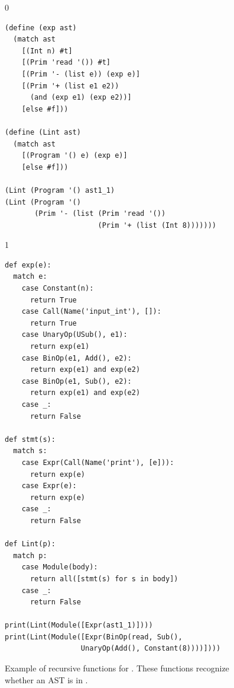 \documentclass[7x10,nocrop]{TimesAPriori_MIT}%
\def\racketEd{0}
\def\pythonEd{1}
\def\edition{1}
\begin{document}
\begin{figure}[tp]
{\if\edition\racketEd
\begin{lstlisting}
(define (exp ast)
  (match ast
    [(Int n) #t]
    [(Prim 'read '()) #t]
    [(Prim '- (list e)) (exp e)]
    [(Prim '+ (list e1 e2))
      (and (exp e1) (exp e2))]
    [else #f]))

(define (Lint ast)
  (match ast
    [(Program '() e) (exp e)]
    [else #f]))

(Lint (Program '() ast1_1)
(Lint (Program '()
       (Prim '- (list (Prim 'read '())
                      (Prim '+ (list (Int 8)))))))
\end{lstlisting}
\fi}
{\if\edition\pythonEd
\begin{lstlisting}
def exp(e):
  match e:
    case Constant(n):
      return True
    case Call(Name('input_int'), []):
      return True
    case UnaryOp(USub(), e1):
      return exp(e1)
    case BinOp(e1, Add(), e2):
      return exp(e1) and exp(e2)
    case BinOp(e1, Sub(), e2):
      return exp(e1) and exp(e2)
    case _:
      return False

def stmt(s):
  match s:
    case Expr(Call(Name('print'), [e])):
      return exp(e)
    case Expr(e):
      return exp(e)
    case _:
      return False
  
def Lint(p):
  match p:
    case Module(body):
      return all([stmt(s) for s in body])
    case _:
      return False

print(Lint(Module([Expr(ast1_1)])))
print(Lint(Module([Expr(BinOp(read, Sub(),
                  UnaryOp(Add(), Constant(8))))])))
\end{lstlisting}
\fi}

\caption{Example of recursive functions for \LangInt{}. These functions
  recognize whether an AST is in \LangInt{}.}
\label{fig:exp-predicate}
\end{figure}


\end{document}
